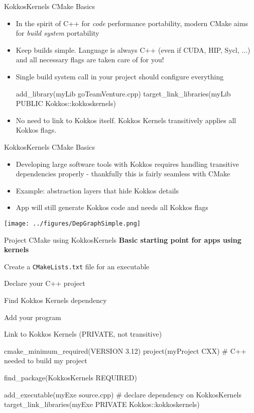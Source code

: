 \begin{frame}[fragile]{KokkosKernels CMake Basics}
\begin{itemize}
\item In the spirit of C++ for \emph{code} performance portability, modern CMake aims for \emph{build system} portability
\item Keep builds simple. Language is always C++ (even if CUDA, HIP, Sycl, ...) and all necessary flags are taken care of for you!
\item Single build system call in your project should configure everything
\vskip0.5cm
\begin{shell}
add_library(myLib goTeamVenture.cpp)
target_link_libraries(myLib PUBLIC 
                     Kokkos::kokkoskernels)
\end{shell}
\vskip0.5cm
\item No need to link to Kokkos itself. Kokkos Kernels transitively applies all Kokkos flags.
\end{itemize}
\end{frame}


\begin{frame}[fragile]{KokkosKernels CMake Basics}
\begin{itemize}
\item Developing large software tools with Kokkos requires handling transitive dependencies properly - thankfully this is fairly seamless with CMake
\item Example: abstraction layers that hide Kokkos details
\item App will still generate Kokkos code and needs all Kokkos flags
\end{itemize}
\texttt{[image: ../figures/DepGraphSimple.png]}
\end{frame}

\begin{frame}[fragile]{Project CMake using KokkosKernels}
\textbf{Basic starting point for apps using kernels }
\begin{itemize}
\item Create a \texttt{CMakeLists.txt} file for an executable
 { \item Declare your C++ project }
 { \item Find Kokkos Kernels dependency }
 { \item Add your program }
 { \item Link to Kokkos Kernels (PRIVATE, not transitive) }
\end{itemize}

\begin{cmake}[linebackground={
  \btLstHL<2>{2}{orange!30}
  \btLstHL<3>{4}{orange!30}
  \btLstHL<4>{6}{orange!30}
  \btLstHL<5>{8-9}{orange!30}    
}]
    cmake_minimum_required(VERSION 3.12)
    project(myProject CXX) # C++ needed to build my project

    find_package(KokkosKernels REQUIRED)

    add_executable(myExe source.cpp)
    # declare dependency on KokkosKernels
    target_link_libraries(myExe PRIVATE 
                 Kokkos::kokkoskernels)
\end{cmake}
\end{frame}


